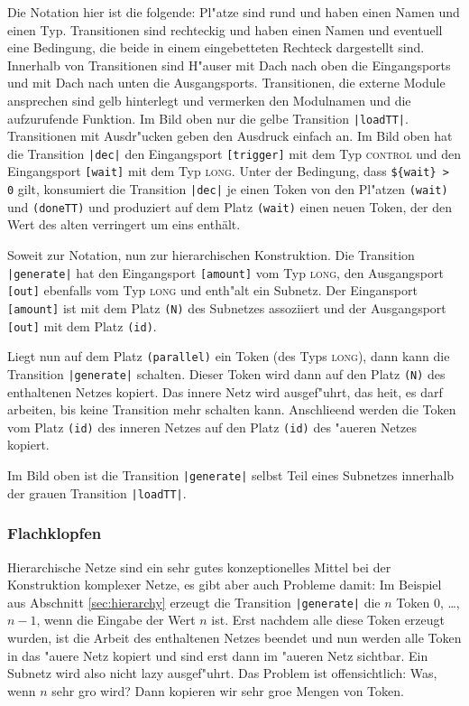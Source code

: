 \documentclass[a4paper,12pt]{article}
\newlength{\st}\setlength{\st}{0pt}
\newcommand{\type}[1]{\textsc{#1}}
\newcommand{\expression}[1]{\texttt{#1}}
\newcommand{\transition}[1]{\texttt{|#1|}}
\newcommand{\place}[1]{\texttt{(#1)}}
\newcommand{\port}[1]{\texttt{[#1]}}
\begin{document}
Die Notation hier ist die folgende: Pl"atze sind rund und haben einen
Namen und einen Typ. Transitionen sind rechteckig und haben einen
Namen und eventuell eine Bedingung, die beide in einem eingebetteten
Rechteck dargestellt sind. Innerhalb von Transitionen sind H"auser mit
Dach nach oben die Eingangsports und mit Dach nach unten die
Ausgangsports. Transitionen, die externe Module ansprechen sind gelb
hinterlegt und vermerken den Modulnamen und die aufzurufende
Funktion. Im Bild oben nur die gelbe Transition
\transition{loadTT}. Transitionen mit Ausdr"ucken geben den Ausdruck
einfach an. Im Bild oben hat die Transition \transition{dec} den
Eingangsport \port{trigger} mit dem Typ \type{control} und den
Eingangsport \port{wait} mit dem Typ \type{long}. Unter der
Bedingung, dass \expression{\$\{wait\} > 0} gilt, konsumiert die
Transition \transition{dec} je einen Token von den Pl"atzen \place{wait}
und \place{doneTT} und produziert auf dem Platz \place{wait} einen
neuen Token, der den Wert des alten verringert um eins enth\"alt.

Soweit zur Notation, nun zur hierarchischen Konstruktion. Die
Transition \transition{generate} hat den Eingangsport \port{amount} vom
Typ \type{long}, den Ausgangsport \port{out} ebenfalls vom Typ
\type{long} und enth"alt ein Subnetz. Der Eingansport \port{amount}
ist mit dem Platz \place{N} des Subnetzes assoziiert und der
Ausgangsport \port{out} mit dem Platz \place{id}.

Liegt nun auf dem Platz \place{parallel} ein Token (des Typs
\type{long}), dann kann die Transition \transition{generate}
schalten. Dieser Token wird dann auf den Platz \place{N} des
enthaltenen Netzes kopiert. Das innere Netz wird ausgef"uhrt, das
hei\3t, es darf arbeiten, bis keine Transition mehr schalten
kann. Anschlie\3end werden die Token vom Platz \place{id} des inneren
Netzes auf den Platz \place{id} des "au\3eren Netzes kopiert.

Im Bild oben ist die Transition \transition{generate} selbst Teil eines
Subnetzes innerhalb der grauen Transition \transition{loadTT}.

\subsubsection{Flachklopfen}

Hierarchische Netze sind ein sehr gutes konzeptionelles Mittel bei der
Konstruktion komplexer Netze, es gibt aber auch Probleme damit: Im
Beispiel aus Abschnitt \ref{sec:hierarchy} erzeugt die Transition
\transition{generate} die $n$ Token $0$, \ldots, $n-1$, wenn die Eingabe
der Wert $n$ ist. Erst nachdem alle diese Token erzeugt wurden, ist
die Arbeit des enthaltenen Netzes beendet und nun werden alle Token in
das "au\3ere Netz kopiert und sind erst dann im "au\3eren Netz
sichtbar. Ein Subnetz wird also nicht lazy ausgef"uhrt. Das Problem
ist offensichtlich: Was, wenn $n$ sehr gro\3 wird? Dann kopieren wir
sehr gro\3e Mengen von Token.
\end{document}
